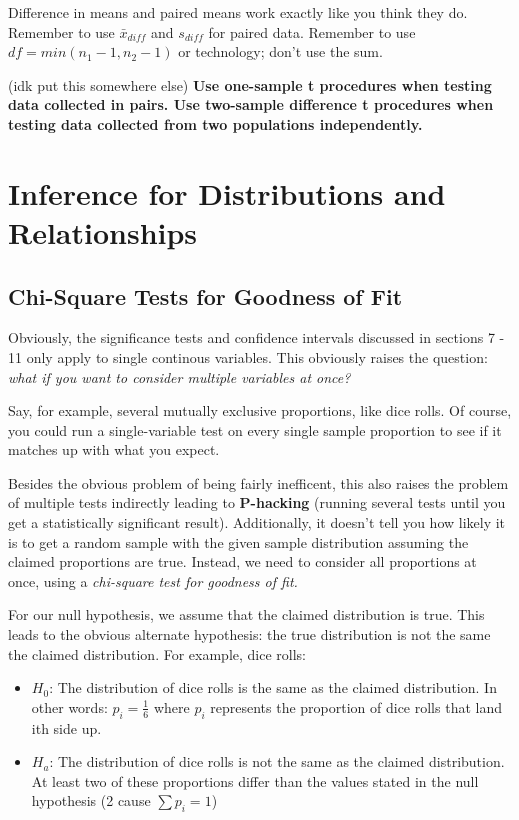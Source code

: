 \documentclass[12pt, a4paper]{article}
\theoremstyle{definition}
\begin{document}
Difference in means and paired means work exactly like you think they do.
Remember to use $\bar{x}_{diff}$ and $s_{diff}$ for paired data.
Remember to use $df = min(n_1 - 1, n_2 - 1)$ or technology; don't use the sum.

(idk put this somewhere else) \textbf{Use one-sample t procedures when testing data collected in pairs. Use two-sample difference t procedures when testing data collected from two populations independently.}
\newpage

\section{Inference for Distributions and Relationships}

\subsection{Chi-Square Tests for Goodness of Fit}
Obviously, the significance tests and confidence intervals discussed in sections 7 - 11 only apply to single continous variables.
This obviously raises the question: \textit{what if you want to consider multiple variables at once?}

Say, for example, several mutually exclusive proportions, like dice rolls.
Of course, you could run a single-variable test on every single sample proportion to see if it matches up with what you expect.

Besides the obvious problem of being fairly inefficent, this also raises the problem of multiple tests indirectly leading to \textbf{P-hacking} (running several tests until you get a statistically significant result).
Additionally, it doesn't tell you how likely it is to get a random sample with the given sample distribution assuming the claimed proportions are true.
Instead, we need to consider all proportions at once, using a \textit{chi-square test for goodness of fit.}

For our null hypothesis, we assume that the claimed distribution is true.
This leads to the obvious alternate hypothesis: the true distribution is not the same the claimed distribution.
For example, dice rolls:
\begin{itemize}
    \item $H_0$: The distribution of dice rolls is the same as the claimed distribution.
    In other words: $p_i = \frac{1}{6}$ where $p_i$ represents the proportion of dice rolls that land ith side up.
    \item $H_a$: The distribution of dice rolls is not the same as the claimed distribution.
    At least two of these proportions differ than the values stated in the null hypothesis (2 cause $\sum p_i = 1$) 
\end{itemize}
\end{document}
